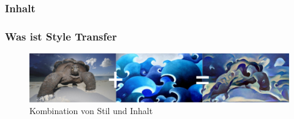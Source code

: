\maketitle
\begin{frame}
    \frametitle{Inhalt}
    \tableofcontents
\end{frame}

\begin{frame}
    \frametitle{Was ist Style Transfer}

    \begin{figure}[H]
        \centering
        \includegraphics[width=1.0\textwidth]{resources/neuralstyle.png}
        \caption{Kombination von Stil und Inhalt \cite{pytorch_turtle_img}}
        \label{img:pytorch_turtle_img}
    \end{figure}
\end{frame}